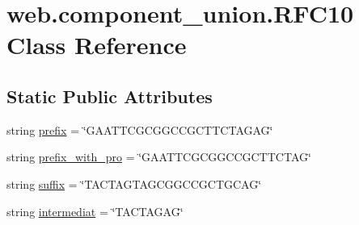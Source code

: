 \hypertarget{classweb_1_1component__union_1_1_r_f_c10}{\section{web.\-component\-\_\-union.\-R\-F\-C10 Class Reference}
\label{classweb_1_1component__union_1_1_r_f_c10}
}
\subsection*{Static Public Attributes}
\begin{DoxyCompactItemize}
\item 
string \hyperlink{classweb_1_1component__union_1_1_r_f_c10_a1d6b141c104e00fbca5eec8fbe28f32b}{prefix} = \char`\"{}G\-A\-A\-T\-T\-C\-G\-C\-G\-G\-C\-C\-G\-C\-T\-T\-C\-T\-A\-G\-A\-G\char`\"{}
\item 
string \hyperlink{classweb_1_1component__union_1_1_r_f_c10_a0fbd566518fac8b5840641dd4d024860}{prefix\-\_\-with\-\_\-pro} = \char`\"{}G\-A\-A\-T\-T\-C\-G\-C\-G\-G\-C\-C\-G\-C\-T\-T\-C\-T\-A\-G\char`\"{}
\item 
string \hyperlink{classweb_1_1component__union_1_1_r_f_c10_ac2650362ac0e37bbe76d7d2ca7c34d0a}{suffix} = \char`\"{}T\-A\-C\-T\-A\-G\-T\-A\-G\-C\-G\-G\-C\-C\-G\-C\-T\-G\-C\-A\-G\char`\"{}
\item 
string \hyperlink{classweb_1_1component__union_1_1_r_f_c10_adb75408ad665c2677622cc29c836af11}{intermediat} = \char`\"{}T\-A\-C\-T\-A\-G\-A\-G\char`\"{}
\end{DoxyCompactItemize}



